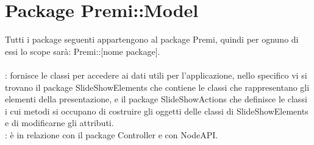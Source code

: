 \section{Package Premi::Model}
	Tutti i package seguenti appartengono al package Premi, quindi per ognuno di essi lo scope sarà: Premi::[nome package]. \\\\
	\textbf{\tipo}: fornisce le classi per accedere ai dati utili per l'applicazione, nello specifico vi si trovano il package SlideShowElements che contiene le classi che rappresentano gli elementi della presentazione, e il package SlideShowActions che definisce le classi i cui metodi si occupano di costruire gli oggetti delle classi di SlideShowElements e di modificarne gli attributi.\\
	\textbf{\relaz}: è in relazione con il package Controller e con NodeAPI.\\
	
	\newpage
	
	\newpage
	
	\newpage
	
	\newpage
	
	\newpage
	

